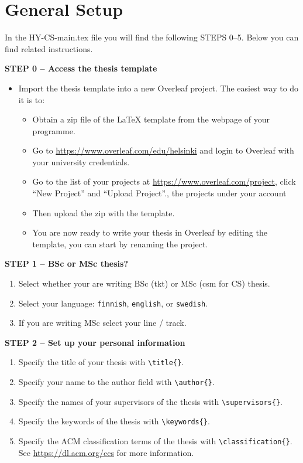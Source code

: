

\section{General Setup}

In the HY-CS-main.tex file you will find the following STEPS 0--5. Below you can find related instructions.
\vspace{0.5cm}

\textbf{STEP 0 -- Access the thesis template}

\begin{itemize}
\item Import the thesis template into a new Overleaf project. The easiest way to do it is to:
\begin{itemize}
    \item Obtain a zip file of the LaTeX template from the webpage of your programme.
    \item Go to \url{https://www.overleaf.com/edu/helsinki} and login to Overleaf with your university credentials.
    \item Go to the list of your projects at \url{https://www.overleaf.com/project}, click ``New Project'' and ``Upload Project''.,  the projects under your account
    \item Then upload the zip with the template.
    \item You are now ready to write your thesis in Overleaf by editing the template, you can start by renaming the project.
\end{itemize}
\end{itemize}


{\textbf{STEP 1 -- BSc or MSc thesis?}}
\begin{enumerate}
\item Select whether your are writing BSc (tkt) or MSc (csm for CS) thesis.
\item Select your language: \texttt{finnish}, \texttt{english}, or \texttt{swedish}.
\item If you are writing MSc select your line / track.
\end{enumerate}


{\textbf{STEP 2 -- Set up your personal information}}

\begin{enumerate}
\item Specify the title of your thesis with \texttt{\textbackslash title\{\}}.
\item Specify your name to the author field with \texttt{\textbackslash author\{\}}.
\item Specify the names of your supervisors of the thesis with \texttt{\textbackslash supervisors\{\}}.
\item Specify the keywords of the thesis with \texttt{\textbackslash keywords\{\}}.
\item Specify the ACM classification terms of the thesis with \texttt{\textbackslash classification\{\}}. See \url{https://dl.acm.org/ccs} for more information.
\end{enumerate}

